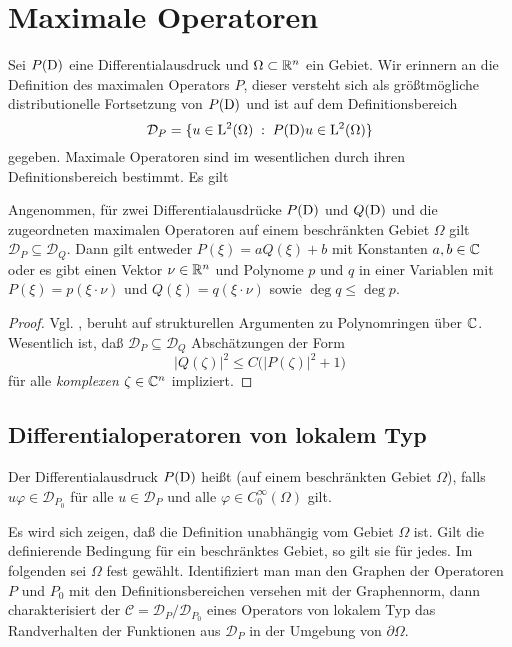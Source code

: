 \chapter{Maximale Operatoren}


Sei $P(\mathrm D)$ eine Differentialausdruck und $\Omega\subset\mathbb R^n$ ein Gebiet. Wir erinnern an die Definition des maximalen Operators $P$, dieser versteht sich als größtmögliche distributionelle Fortsetzung von $P(\mathrm D)$ und ist auf dem Definitionsbereich
\begin{equation}
   \mathcal D_P = \{ u\in\mathrm L^2(\Omega)\;:\; P(\mathrm D)u\in\mathrm L^2(\Omega) \}
\end{equation}
gegeben. Maximale Operatoren sind im wesentlichen durch ihren Definitionsbereich bestimmt. Es gilt
\begin{thm}
Angenommen, für zwei Differentialausdrücke $P(\mathrm D)$ und $Q(\mathrm D)$ und die zugeordneten maximalen Operatoren auf einem beschränkten Gebiet $\Omega$ gilt $\mathcal D_P\subseteq\mathcal D_Q$. Dann gilt
entweder $P(\xi)=a Q(\xi) + b$ mit Konstanten $a,b\in\mathbb C$ oder es gibt einen Vektor $\nu\in\mathbb R^n$ und Polynome $p$ und $q$ in einer Variablen mit
$P(\xi)=p(\xi\cdot\nu)$ und $Q(\xi)=q(\xi\cdot\nu)$ sowie $\deg q\le\deg p$.
\end{thm}
\begin{proof} Vgl. \cite{Hormander:1955}, beruht auf strukturellen Argumenten zu Polynomringen über $\mathbb C$. Wesentlich ist, daß $\mathcal D_P\subseteq \mathcal D_Q$ Abschätzungen der Form 
\begin{equation}
   |Q(\zeta)|^2 \le C \big( |P(\zeta)|^2 + 1\big)%
\end{equation}
für alle {\em komplexen} $\zeta\in\mathbb C^n$ impliziert.
\end{proof}




\section{Differentialoperatoren von lokalem Typ} %
\begin{df}
Der Differentialausdruck $P(\mathrm D)$ heißt  (auf einem beschränkten Gebiet $\Omega$), falls $u\varphi\in\mathcal D_{P_0}$ für alle $u\in\mathcal D_{P}$ und alle $\varphi\in C_0^\infty(\Omega)$ gilt.
\end{df}
Es wird sich zeigen, daß die Definition unabhängig vom Gebiet $\Omega$ ist. Gilt die definierende Bedingung für ein beschränktes Gebiet, so gilt sie für jedes. Im folgenden sei $\Omega$ fest gewählt. Identifiziert man man den Graphen der Operatoren $P$ und $P_0$ mit den Definitionsbereichen versehen mit der Graphennorm, dann charakterisiert der  $\mathcal C = \mathcal D_{P}/\mathcal D_{P_0}$ eines Operators von lokalem Typ das Randverhalten der Funktionen aus $\mathcal D_{P}$ in der Umgebung von $\partial\Omega$.

